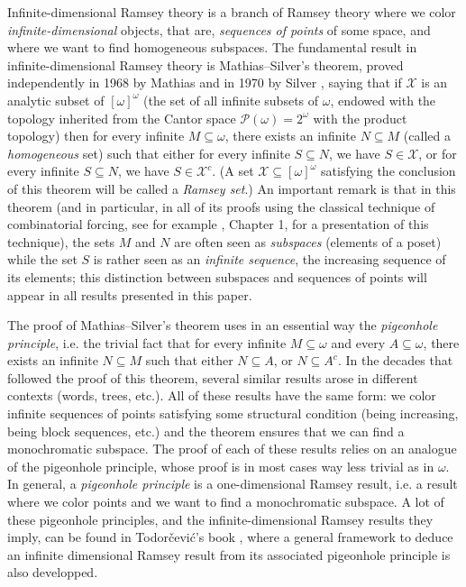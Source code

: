 \documentclass[a4paper,11pt]{article}
\theoremstyle{definition}
\numberwithin{equation}{section}
\newcommand{\X}{\mathcal{X}}
\newcommand{\elinf}{[\omega]^\omega}
\begin{document}
\smallskip

Infinite-dimensional Ramsey theory is a branch of Ramsey theory where we color \emph{infinite-dimensional} objects, that are, \emph{sequences of points} of some space, and where we want to find homogeneous subspaces. The fundamental result in infinite-dimensional Ramsey theory is Mathias--Silver's theorem, proved independently in 1968 by Mathias \cite{mathias} and in 1970 by Silver \cite{silver}, saying that if $\X$ is an analytic subset of $\elinf$ (the set of all infinite subsets of $\omega$, endowed with the topology inherited from the Cantor space $\mathcal{P}(\omega) = 2^\omega$ with the product topology) then for every infinite $M \subseteq \omega$, there exists an infinite $N \subseteq M$ (called a \emph{homogeneous} set) such that either for every infinite $S \subseteq N$, we have $S \in \X$, or for every infinite $S \subseteq N$, we have $S \in \X^c$. (A set $\X \subseteq \elinf$ satisfying the conclusion of this theorem will be called a \emph{Ramsey set}.) An important remark is that in this theorem (and in particular, in all of its proofs using the classical technique of combinatorial forcing, see for example \cite{todorcevicorange}, Chapter 1, for a presentation of this technique), the sets $M$ and $N$ are often seen as \emph{subspaces} (elements of a poset) while the set $S$ is rather seen as an \emph{infinite sequence}, the increasing sequence of its elements; this distinction between subspaces and sequences of points will appear in all results presented in this paper.

\smallskip

The proof of Mathias--Silver's theorem uses in an essential way the \emph{pigeonhole principle}, i.e. the trivial fact that for every infinite $M \subseteq \omega$ and every $A \subseteq \omega$, there exists an infinite $N \subseteq M$ such that either $N \subseteq A$, or $N \subseteq A^c$. In the decades that followed the proof of this theorem, several similar results arose in different contexts (words, trees, etc.). All of these results have the same form: we color infinite sequences of points satisfying some structural condition (being increasing, being block sequences, etc.) and the theorem ensures that we can find a monochromatic subspace. The proof of each of these results relies on an analogue of the pigeonhole principle, whose proof is in most cases way less trivial as in $\omega$. In general, a \emph{pigeonhole principle} is a one-dimensional Ramsey result, i.e. a result where we color points and we want to find a monochromatic subspace. A lot of these pigeonhole principles, and the infinite-dimensional Ramsey results they imply, can be found in Todor\v{c}evi\'c's book \cite{todorcevicorange}, where a general framework to deduce an infinite dimensional Ramsey result from its associated pigeonhole principle is also developped.
\end{document}
